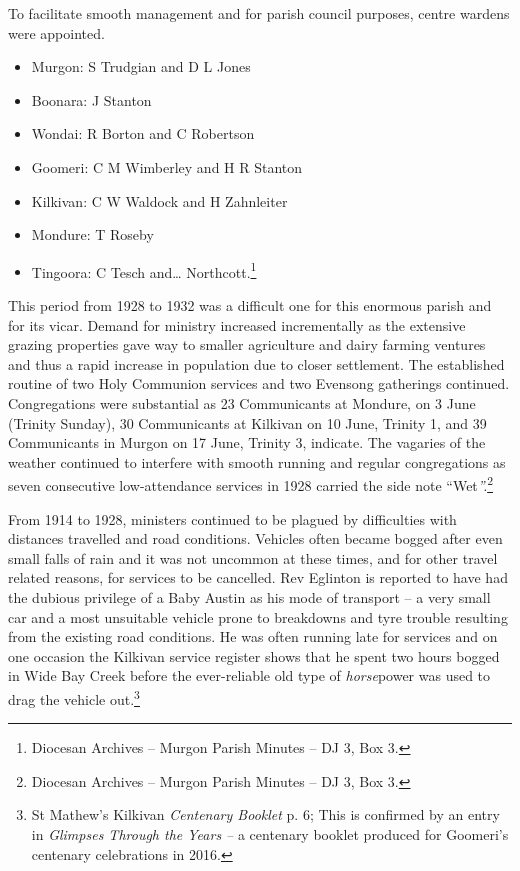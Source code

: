 To facilitate smooth management and for parish council purposes, centre wardens were appointed.

\begin{itemize}
\item
  Murgon: S Trudgian and D L Jones
\item
  Boonara: J Stanton
\item
  Wondai: R Borton and C Robertson
\item
  Goomeri: C M Wimberley and H R Stanton
\item
  Kilkivan: C W Waldock and H Zahnleiter
\item
  Mondure: T Roseby
\item
  Tingoora: C Tesch and\ldots{} Northcott.\footnote{Diocesan Archives -- Murgon Parish Minutes -- DJ 3, Box 3.}
\end{itemize}

This period from 1928 to 1932 was a difficult one for this enormous parish and for its vicar. Demand for ministry increased incrementally as the extensive grazing properties gave way to smaller agriculture and dairy farming ventures and thus a rapid increase in population due to closer settlement. The established routine of two Holy Communion services and two Evensong gatherings continued. Congregations were substantial as 23 Communicants at Mondure, on 3 June (Trinity Sunday), 30 Communicants at Kilkivan on 10 June, Trinity 1, and 39 Communicants in Murgon on 17 June, Trinity 3, indicate. The vagaries of the weather continued to interfere with smooth running and regular congregations as seven consecutive low-attendance services in 1928 carried the side note ``Wet\emph{''.}\footnote{Diocesan Archives -- Murgon Parish Minutes -- DJ 3, Box 3.}

From 1914 to 1928, ministers continued to be plagued by difficulties with distances travelled and road conditions. Vehicles often became bogged after even small falls of rain and it was not uncommon at these times, and for other travel related reasons, for services to be cancelled. Rev Eglinton is reported to have had the dubious privilege of a Baby Austin as his mode of transport -- a very small car and a most unsuitable vehicle prone to breakdowns and tyre trouble resulting from the existing road conditions. He was often running late for services and on one occasion the Kilkivan service register shows that he spent two hours bogged in Wide Bay Creek before the ever-reliable old type of \emph{horse}power was used to drag the vehicle out.\footnote{St Mathew's Kilkivan \emph{Centenary Booklet} p. 6; This is confirmed by an entry in \emph{Glimpses Through the Years --} a centenary booklet produced for Goomeri's centenary celebrations in 2016.}

